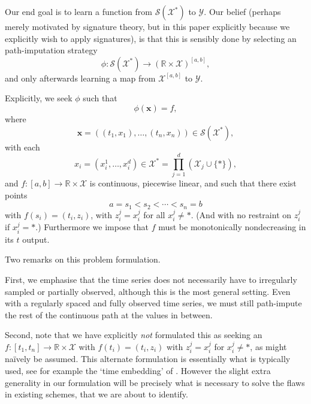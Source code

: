 \documentclass{article}
\newcommand{\reals}{\mathbb{R}}
\newcommand{\dataspace}{\mathcal{X}}
\newcommand{\lspace}{\mathcal{Y}}
\newcommand{\seriesspace}{\mathcal{S}}
\begin{document}
Our end goal is to learn a function from $\seriesspace(\dataspace^*)$ to $\lspace$. Our belief (perhaps merely motivated by signature theory, but in this paper explicitly because we explicitly wish to apply signatures), is that this is sensibly done by selecting an path-imputation strategy
\begin{equation*}
    \phi \colon \seriesspace(\dataspace^*) \to (\reals \times \dataspace)^{[a, b]},
\end{equation*}
and only afterwards learning a map from $\dataspace^{[a, b]}$ to $\lspace$.

Explicitly, we seek $\phi$ such that
\begin{equation}\label{eq:phi}
\phi(\mathbf{x}) = f,    
\end{equation}
where
\begin{equation*}
\mathbf{x} = ((t_1, x_1), \ldots, (t_n, x_n)) \in \seriesspace(\dataspace^*),    
\end{equation*}
with each
\begin{equation*}
    x_i = (x_i^1, \ldots, x_i^d) \in \dataspace^* = \prod_{j = 1}^d (\dataspace_j \cup \{*\}),
\end{equation*}
and $f \colon [a, b] \to \reals \times \dataspace$ is continuous, piecewise linear, and such that there exist points
\begin{equation}\label{eq:ss}
a = s_1 < s_2 < \cdots < s_n = b    
\end{equation}
with $f(s_i) = (t_i, z_i)$, with $z_i^j = x_i^j$ for all $x_i^j \neq *$. (And with no restraint on $z_i^j$ if $x_i^j = *$.) Furthermore we impose that $f$ must be monotonically nondecreasing in its $t$ output.

Two remarks on this problem formulation.

First, we emphasise that the time series does not necessarily have to irregularly sampled or partially observed, although this is the most general setting. Even with a regularly spaced and fully observed time series, we must still path-impute the rest of the continuous path at the values in between.

Second, note that we have explicitly \emph{not} formulated this as seeking an $f \colon [t_1, t_n] \to \reals \times \dataspace$ with $f(t_i) = (t_i, z_i)$ with $z_i^j = x_i^j$ for $x_i^j \neq *$, as might na{\"i}vely be assumed. This alternate formulation is essentially what is typically used, see for example the `time embedding' of \citet{fermanian2019embedding}. However the slight extra generality in our formulation will be precisely what is necessary to solve the flaws in existing schemes, that we are about to identify.
\end{document}
